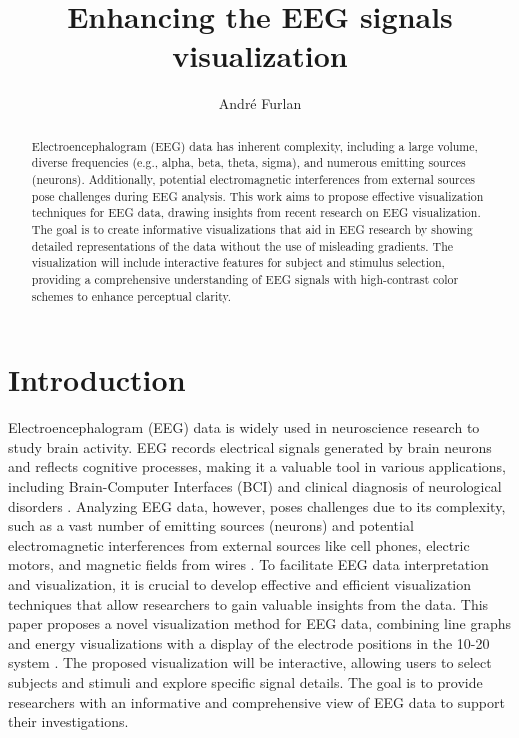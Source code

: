 \documentclass[format=sigconf]{acmart}
\title{Enhancing the EEG signals visualization}
\author{André Furlan}
\affiliation{
	\institution{UNESP - Universidade Estadual Paulista Júlio de Mesquita Filho}
	\city{São José do Rio Preto}
	\state{André Furlan}
	\country{Brazil}
}
\begin{document}
	
	\begin{abstract}
		Electroencephalogram (EEG) data has inherent complexity, including a large volume, diverse frequencies (e.g., alpha, beta, theta, sigma), and numerous emitting sources (neurons). Additionally, potential electromagnetic interferences from external sources pose challenges during EEG analysis. This work aims to propose effective visualization techniques for EEG data, drawing insights from recent research on EEG visualization. The goal is to create informative visualizations that aid in EEG research by showing detailed representations of the data without the use of misleading gradients. The visualization will include interactive features for subject and stimulus selection, providing a comprehensive understanding of EEG signals with high-contrast color schemes to enhance perceptual clarity.
	\end{abstract}
	
	\maketitle
	
	\section{Introduction}
		\par Electroencephalogram (EEG) data is widely used in neuroscience research to study brain activity. EEG records electrical signals generated by brain neurons and reflects cognitive processes, making it a valuable tool in various applications, including Brain-Computer Interfaces (BCI) and clinical diagnosis of neurological disorders \cite{8937083}. Analyzing EEG data, however, poses challenges due to its complexity, such as a vast number of emitting sources (neurons) and potential electromagnetic interferences from external sources like cell phones, electric motors, and magnetic fields from wires \cite{8937083}. To facilitate EEG data interpretation and visualization, it is crucial to develop effective and efficient visualization techniques that allow researchers to gain valuable insights from the data. This paper proposes a novel visualization method for EEG data, combining line graphs and energy visualizations with a display of the electrode positions in the 10-20 system \cite{sistema10-20}. The proposed visualization will be interactive, allowing users to select subjects and stimuli and explore specific signal details. The goal is to provide researchers with an informative and comprehensive view of EEG data to support their investigations.
	
\end{document}
